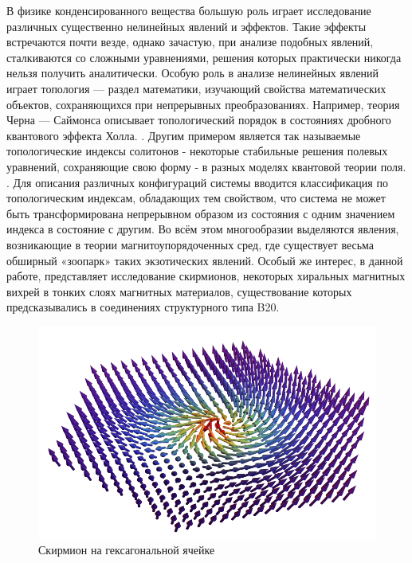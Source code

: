 \documentclass[a4paper,article,14pt]{extarticle}
\begin{document}


\tableofcontents
\pagebreak

В физике конденсированного вещества большую роль играет исследование различных существенно нелинейных явлений и эффектов. Такие эффекты встречаются почти везде, однако зачастую, при анализе подобных явлений, сталкиваются со сложными уравнениями, решения которых практически никогда нельзя получить аналитически. Особую роль в анализе нелинейных явлений играет топология --- раздел математики, изучающий свойства математических объектов, сохраняющихся при непрерывных преобразованиях. Например, теория Черна — Саймонса описывает топологический порядок в состояниях дробного квантового эффекта Холла. \cite{chern-simons}. Другим примером является так называемые топологические индексы солитонов - некоторые стабильные решения полевых уравнений, сохраняющие свою форму - в разных моделях квантовой теории поля. \cite{rajaraman}. Для описания различных конфигураций системы вводится классификация по топологическим индексам, обладающих тем свойством, что система не может быть трансформирована непрерывном образом из состояния с одним значением индекса в состояние с другим. Во всём этом многообразии выделяются явления, возникающие в теории магнитоупорядоченных сред, где существует весьма обширный «зоопарк» таких экзотических явлений. Особый же интерес, в данной работе, представляет исследование скирмионов, некоторых хиральных магнитных вихрей в тонких слоях магнитных материалов, существование которых предсказывались в соединениях структурного типа B20.\cite{paper:roslerBogdanov}



\begin{figure}[h]
	\centering
	\includegraphics[width=0.5\paperwidth]{images/skyrmionPic.png}
	\caption{Скирмион на гексагональной ячейке}
	\label{pic:skyrmion}
\end{figure}
\end{document}
